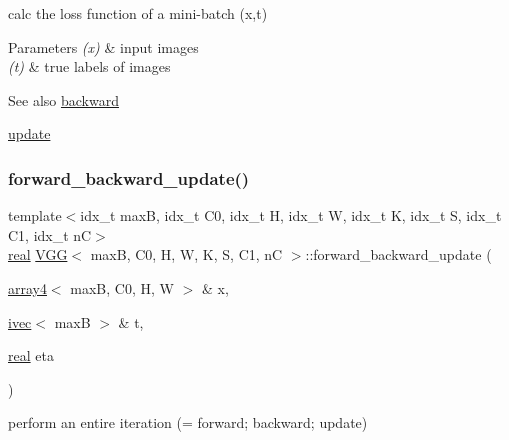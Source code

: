 calc the loss function of a mini-\/batch (x,t) 


\begin{DoxyParams}{Parameters}
{\em (x)} & input images \\
\hline
{\em (t)} & true labels of images \\
\hline
\end{DoxyParams}
\begin{DoxySeeAlso}{See also}
\hyperlink{structVGG_ad6c413558605836d7cffa87dc2971628}{backward} 

\hyperlink{structVGG_a1adaccb289e6577317b49df5e1f3b465}{update} 
\end{DoxySeeAlso}
\mbox{\label{structVGG_a5a97c3db3635e480b1160ff24793feb6}} 
\subsubsection{\texorpdfstring{forward\+\_\+backward\+\_\+update()}{forward\_backward\_update()}}
{\footnotesize\ttfamily template$<$idx\+\_\+t maxB, idx\+\_\+t C0, idx\+\_\+t H, idx\+\_\+t W, idx\+\_\+t K, idx\+\_\+t S, idx\+\_\+t C1, idx\+\_\+t nC$>$ \\
\hyperlink{vgg__util_8h_a1082d08aaa761215ec83e7149f27ad16}{real} \hyperlink{structVGG}{V\+GG}$<$ maxB, C0, H, W, K, S, C1, nC $>$\+::forward\+\_\+backward\+\_\+update (\begin{DoxyParamCaption}\item[{\hyperlink{structarray4}{array4}$<$ maxB, C0, H, W $>$ \&}]{x,  }\item[{\hyperlink{structivec}{ivec}$<$ maxB $>$ \&}]{t,  }\item[{\hyperlink{vgg__util_8h_a1082d08aaa761215ec83e7149f27ad16}{real}}]{eta }\end{DoxyParamCaption})\hspace{0.3cm}{\ttfamily [inline]}}



perform an entire iteration (= forward; backward; update) 


